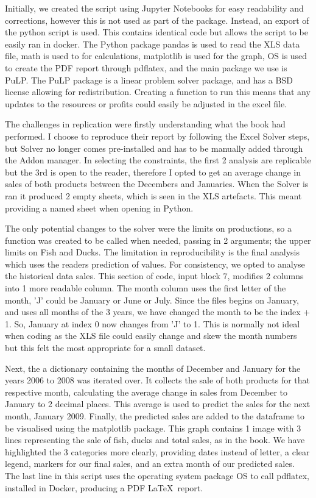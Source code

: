 \documentclass[acmtog]{acmart}
\begin{document}
Initially, we created the script using Jupyter Notebooks for easy readability and corrections, however this is not used as part of the package. Instead, an export of the python script is used. This contains identical code but allows the script to be easily ran in docker. The Python package pandas is used to read the XLS data file, math is used to for calculations, matplotlib is used for the graph, OS is used to create the PDF report through pdflatex, and the main package we use is PuLP. The PuLP package is a linear problem solver package, and has a BSD license allowing for redistribution. Creating a function to run this means that any updates to the resources or profits could easily be adjusted in the excel file.

The challenges in replication were firstly understanding what the book had performed. I choose to reproduce their report by following the Excel Solver steps, but Solver no longer comes pre-installed and has to be manually added through the Addon manager. In selecting the constraints, the first 2 analysis are replicable but the 3rd is open to the reader, therefore I opted to get an average change in sales of both products between the Decembers and Januaries. When the Solver is ran it produced 2 empty sheets, which is seen in the XLS artefacts. This meant providing a named sheet when opening in Python. 

The only potential changes to the solver were the limits on productions, so a function was created to be called when needed, passing in 2 arguments; the upper limits on Fish and Ducks. The limitation in reproducibility is the final analysis which uses the readers prediction of values. For consistency, we opted to analyse the historical data sales. This section of code, input block 7, modifies 2 columns into 1 more readable column. The month column uses the first letter of the month, 'J' could be January or June or July. Since the files begins on January, and uses all months of the 3 years, we have changed the month to be the index + 1. So, January at index 0 now changes from 'J' to 1. This is normally not ideal when coding as the XLS file could easily change and skew the month numbers but this felt the most appropriate for a small dataset. 

Next, the a dictionary containing the months of December and January for the years 2006 to 2008 was iterated over. It collects the sale of both products for that respective month, calculating the average change in sales from December to January to 2 decimal places. This average is used to predict the sales for the next month, January 2009. Finally, the predicted sales are added to the dataframe to be visualised using the matplotlib package. This graph contains 1 image with 3 lines representing the sale of fish, ducks and total sales, as in the book. We have highlighted the 3 categories more clearly, providing dates instead of letter, a clear legend, markers for our final sales, and an extra month of our predicted sales. The last line in this script uses the operating system package OS to call pdflatex, installed in Docker, producing a PDF \LaTeX\ report.
\end{document}
